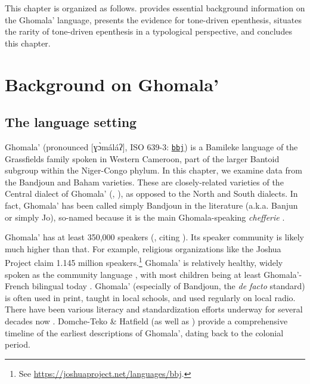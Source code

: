 \documentclass[output=paper,colorlinks,citecolor=brown,draft,draftmode]{langscibook}
\begin{document}
This chapter is organized as follows.
 provides essential background information on the Ghomala' language,  presents the evidence for tone-driven epenthesis,
 situates the rarity of tone-driven epenthesis in a typological perspective,
and  concludes this chapter.

\section{Background on Ghomala'}\label{sec:background}
 
\subsection{The language setting}\label{sec:setting}

Ghomala' (pronounced [ɣɔ̀máláʔ],   
ISO 639-3: \href{https://glottolog.org/resource/languoid/id/ghom1247}{\texttt{bbj}}) 
is a Bamileke language of the Grassfields family spoken in Western Cameroon, part of the larger Bantoid subgroup within the Niger-Congo phylum.
In this chapter, we examine data from the Bandjoun and Baham varieties.
These are closely-related varieties of the Central dialect of Ghomala' (\citealt[3]{domche1991}, \citealt{mba1997}), as opposed to the North and South dialects.
In fact, Ghomala' has been called simply Bandjoun in the literature (a.k.a. Banjun or simply Jo), so-named because it is the main Ghomala-speaking \textit{chefferie} \citep[77]{mba1997}.

Ghomala' has at least 350,000 speakers (\citealt[2]{kamdem2020}, citing \citealt{ethnologue2018}).
Its speaker community is likely much higher than that.
For example, religious organizations like the Joshua Project claim 1.145 million speakers.\footnote{See \url{https://joshuaproject.net/languages/bbj}.}
Ghomala' is relatively healthy, widely spoken as the community language \citep{domche1991}, with most children being at least Ghomala'-French bilingual today \citep[3, fn4]{kamdem2020}.
Ghomala' (especially of Bandjoun, the \textit{de facto} standard) is often used  in print,  taught in local schools,  and used regularly on local radio. 
There have been various literacy and standardization efforts underway for several decades now \citep[8]{domche1991}. 
Domche-Teko \& Hatfield (as well as \citealt[45ff.]{bomda2005}) provide a comprehensive  timeline of the earliest descriptions of  Ghomala', dating back to the colonial period.
\end{document}
